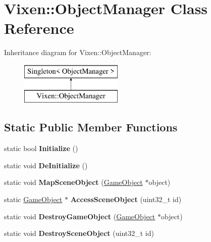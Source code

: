 \hypertarget{class_vixen_1_1_object_manager}{}\section{Vixen\+:\+:Object\+Manager Class Reference}
\label{class_vixen_1_1_object_manager}
Inheritance diagram for Vixen\+:\+:Object\+Manager\+:\begin{figure}[H]
\begin{center}
\leavevmode
\includegraphics[height=2.000000cm]{class_vixen_1_1_object_manager}
\end{center}
\end{figure}
\subsection*{Static Public Member Functions}
\begin{DoxyCompactItemize}
\item 
\hypertarget{class_vixen_1_1_object_manager_adfd6da52267a54a66b87b6043b9d9407}{}static bool {\bfseries Initialize} ()\label{class_vixen_1_1_object_manager_adfd6da52267a54a66b87b6043b9d9407}

\item 
\hypertarget{class_vixen_1_1_object_manager_a93aea2eb4faf98d18ce37b4be8f245bd}{}static void {\bfseries De\+Initialize} ()\label{class_vixen_1_1_object_manager_a93aea2eb4faf98d18ce37b4be8f245bd}

\item 
\hypertarget{class_vixen_1_1_object_manager_ac20569d4c77888c44b9dff2ca666aeb1}{}static void {\bfseries Map\+Scene\+Object} (\hyperlink{class_vixen_1_1_game_object}{Game\+Object} $\ast$object)\label{class_vixen_1_1_object_manager_ac20569d4c77888c44b9dff2ca666aeb1}

\item 
\hypertarget{class_vixen_1_1_object_manager_a5503b8ec68124409aa533e679e8fa768}{}static \hyperlink{class_vixen_1_1_game_object}{Game\+Object} $\ast$ {\bfseries Access\+Scene\+Object} (uint32\+\_\+t id)\label{class_vixen_1_1_object_manager_a5503b8ec68124409aa533e679e8fa768}

\item 
\hypertarget{class_vixen_1_1_object_manager_a34a161d2e3446825b17fff149e422fa2}{}static void {\bfseries Destroy\+Game\+Object} (\hyperlink{class_vixen_1_1_game_object}{Game\+Object} $\ast$object)\label{class_vixen_1_1_object_manager_a34a161d2e3446825b17fff149e422fa2}

\item 
\hypertarget{class_vixen_1_1_object_manager_a99d448d3077993f34cbcd0121a1ff8ad}{}static void {\bfseries Destroy\+Scene\+Object} (uint32\+\_\+t id)\label{class_vixen_1_1_object_manager_a99d448d3077993f34cbcd0121a1ff8ad}

\end{DoxyCompactItemize}


